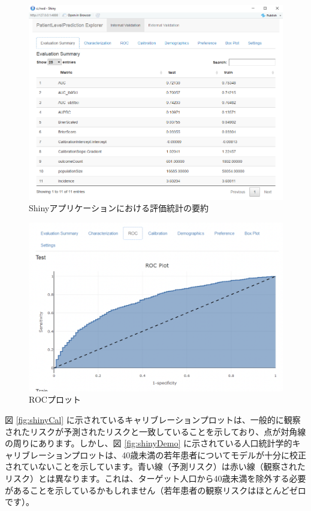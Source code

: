 \documentclass[
  11pt]{book}
\theoremstyle{definition}
\theoremstyle{definition}
\theoremstyle{definition}
\theoremstyle{definition}
\theoremstyle{remark}
\begin{document}
\begin{figure}
\includegraphics[width=1\linewidth]{images/PatientLevelPrediction/shinysummary} \caption{Shinyアプリケーションにおける評価統計の要約}\label{fig:shinySummary}
\end{figure}

\begin{figure}

{\centering \includegraphics[width=1\linewidth]{images/PatientLevelPrediction/shiny/singleShiny/singleShinyRoc} 

}

\caption{ROCプロット}\label{fig:shinyROC}
\end{figure}

図 \ref{fig:shinyCal} に示されているキャリブレーションプロットは、一般的に観察されたリスクが予測されたリスクと一致していることを示しており、点が対角線の周りにあります。しかし、図 \ref{fig:shinyDemo} に示されている人口統計学的キャリブレーションプロットは、40歳未満の若年患者についてモデルが十分に校正されていないことを示しています。青い線（予測リスク）は赤い線（観察されたリスク）とは異なります。これは、ターゲット人口から40歳未満を除外する必要があることを示しているかもしれません（若年患者の観察リスクはほとんどゼロです）。
\end{document}
